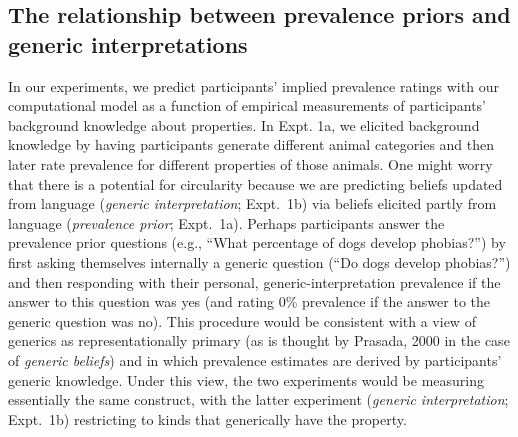\documentclass[floatsintext,doc]{apa6}
\begin{document}
\hypertarget{the-relationship-between-prevalence-priors-and-generic-interpretations}{%
\subsection{The relationship between prevalence priors and generic interpretations}\label{the-relationship-between-prevalence-priors-and-generic-interpretations}}


In our experiments, we predict participants' implied prevalence ratings with our computational model as a function of empirical measurements of participants' background knowledge about properties. 
In Expt. 1a, we elicited background knowledge by having participants generate different animal categories and then later rate prevalence for different properties of those animals.
One might worry that there is a potential for circularity because we are predicting beliefs updated from language (\emph{generic interpretation}; Expt.~1b) via beliefs elicited partly from language (\emph{prevalence prior}; Expt.~1a).
Perhaps participants answer the prevalence prior questions (e.g., \enquote{What percentage of dogs develop phobias?}) by first asking themselves internally a generic question (\enquote{Do dogs develop phobias?}) and then responding with their personal, generic-interpretation prevalence if the answer to this question was yes (and rating 0\% prevalence if the answer to the generic question was no).
This procedure would be consistent with a view of generics as representationally primary (as is thought by Prasada, 2000 in the case of \emph{generic beliefs}) and in which prevalence estimates are derived by participants' generic knowledge. 
Under this view, the two experiments would be measuring essentially the same construct, with the latter experiment (\emph{generic interpretation}; Expt.~1b) restricting to  kinds that generically have the property. 
\end{document}
